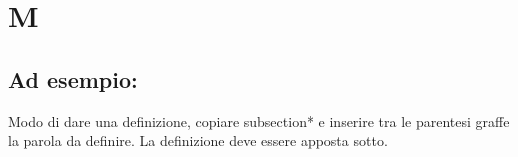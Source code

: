 \section*{M}
\markright{}
\subsection*{Ad esempio:}
Modo di dare una definizione, copiare subsection*{} e inserire tra le parentesi graffe la parola da definire. La definizione deve essere apposta sotto.